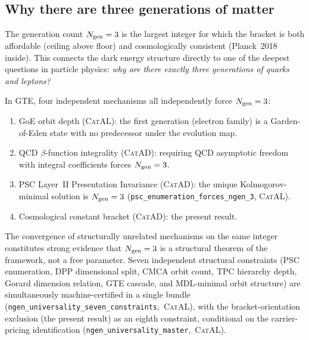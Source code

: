 \documentclass[11pt,a4paper]{article}
\newcommand{\lean}[1]{\texttt{#1}}
\newcommand{\Ngen}{N_{\rm gen}}
\newcommand{\CatAL}{\textsc{CatAL}}
\newcommand{\CatAD}{\textsc{CatAD}}
\begin{document}
\subsection{Why there are three generations of matter}

The generation count $\Ngen = 3$ is the largest integer for which
the bracket is both affordable (ceiling above floor) and cosmologically
consistent (Planck~2018 inside).  This connects the dark energy structure
directly to one of the deepest questions in particle physics:
\emph{why are there exactly three generations of quarks and leptons?}

In GTE, four independent mechanisms all independently force $\Ngen = 3$:
\begin{enumerate}[itemsep=3pt]
  \item GoE orbit depth (\CatAL): the first generation (electron family) is
    a Garden-of-Eden state with no predecessor under the evolution map.
  \item QCD $\beta$-function integrality (\CatAD): requiring QCD asymptotic
    freedom with integral coefficients forces $\Ngen = 3$.
  \item PSC Layer~II Presentation Invariance (\CatAD): the unique
    Kolmogorov-minimal solution is $\Ngen = 3$
    (\lean{psc\_enumeration\_forces\_ngen\_3}, \CatAL).
  \item Cosmological constant bracket (\CatAD): the present result.
\end{enumerate}

The convergence of structurally unrelated mechanisms on the same integer
constitutes strong evidence that $\Ngen = 3$ is a structural theorem of the
framework, not a free parameter.
Seven independent structural constraints (PSC enumeration, DPP dimensional split,
CMCA orbit count, TPC hierarchy depth, Gorard dimension relation, GTE cascade,
and MDL-minimal orbit structure) are simultaneously machine-certified in a single
bundle \mbox{(\lean{ngen\_universality\_seven\_constraints}, \CatAL)}, with the
bracket-orientation exclusion (the present result) as an eighth constraint,
conditional on the carrier-pricing identification
\mbox{(\lean{ngen\_universality\_master}, \CatAL)}.
\end{document}
